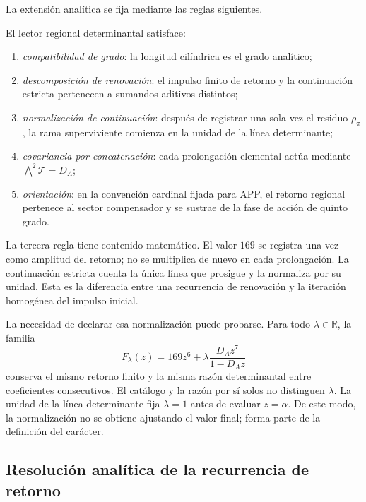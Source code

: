La extensión analítica se fija mediante las reglas siguientes.

\begin{definition}
\label{p3-83-c30-s1:def:lector-regional-determinantal}
El lector regional determinantal satisface:
\begin{enumerate}
  \item \emph{compatibilidad de grado}: la longitud cilíndrica es el grado
  analítico;
  \item \emph{descomposición de renovación}: el impulso finito de retorno y
  la continuación estricta pertenecen a sumandos aditivos distintos;
  \item \emph{normalización de continuación}: después de registrar una sola
  vez el residuo \(\rho_\pi\), la rama superviviente comienza en la unidad de
  la línea determinante;
  \item \emph{covariancia por concatenación}: cada prolongación elemental
  actúa mediante \(\bigwedge^2\mathcal T=D_A\);
  \item \emph{orientación}: en la convención cardinal fijada para APP, el
  retorno regional pertenece al sector compensador y se sustrae de la fase
  de acción de quinto grado.
\end{enumerate}
\end{definition}

La tercera regla tiene contenido matemático. El valor \(169\) se registra
una vez como amplitud del retorno; no se multiplica de nuevo en cada
prolongación. La continuación estricta cuenta la única línea que prosigue y
la normaliza por su unidad. Esta es la diferencia entre una recurrencia de
renovación y la iteración homogénea del impulso inicial.

La necesidad de declarar esa normalización puede probarse. Para todo
\(\lambda\in\mathbb R\), la familia
\[
F_\lambda(z)
=169z^6+\lambda\frac{D_Az^7}{1-D_Az}
\]
conserva el mismo retorno finito y la misma razón determinantal entre
coeficientes consecutivos. El catálogo y la razón por sí solos no distinguen
\(\lambda\). La unidad de la línea determinante fija
\(\lambda=1\) antes de evaluar \(z=\alpha\). De este modo, la normalización
no se obtiene ajustando el valor final; forma parte de la definición del
carácter.

\subsection{Resolución analítica de la recurrencia de retorno}
\label{sec:s102:c38:2:4}


